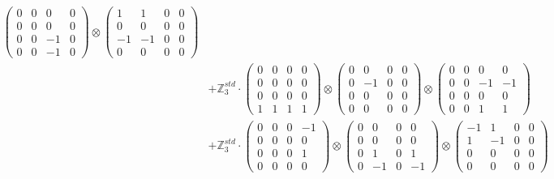 \documentclass{article}
\begin{document}
{\begin{align}
            \begin{pmatrix} 0 & 0 & 0 & 0 \\ 0 & 0 & 0 & 0 \\ 0 & 0 & -1 & 0 \\ 0 & 0 & -1 & 0 \end{pmatrix} \otimes 
            \begin{pmatrix} 1 & 1 & 0 & 0 \\ 0 & 0 & 0 & 0 \\ -1 & -1 & 0 & 0 \\ 0 & 0 & 0 & 0 \end{pmatrix} \\ 
        &+ \label{Rs1-Rc16-Solution-1-c10} \mathbb{Z}_3^{std} \cdot 
            \begin{pmatrix} 0 & 0 & 0 & 0 \\ 0 & 0 & 0 & 0 \\ 0 & 0 & 0 & 0 \\ 1 & 1 & 1 & 1 \end{pmatrix} \otimes 
            \begin{pmatrix} 0 & 0 & 0 & 0 \\ 0 & -1 & 0 & 0 \\ 0 & 0 & 0 & 0 \\ 0 & 0 & 0 & 0 \end{pmatrix} \otimes 
            \begin{pmatrix} 0 & 0 & 0 & 0 \\ 0 & 0 & -1 & -1 \\ 0 & 0 & 0 & 0 \\ 0 & 0 & 1 & 1 \end{pmatrix} \\ 
        &+ \label{Rs1-Rc16-Solution-1-c11} \mathbb{Z}_3^{std} \cdot 
            \begin{pmatrix} 0 & 0 & 0 & -1 \\ 0 & 0 & 0 & 0 \\ 0 & 0 & 0 & 1 \\ 0 & 0 & 0 & 0 \end{pmatrix} \otimes 
            \begin{pmatrix} 0 & 0 & 0 & 0 \\ 0 & 0 & 0 & 0 \\ 0 & 1 & 0 & 1 \\ 0 & -1 & 0 & -1 \end{pmatrix} \otimes 
            \begin{pmatrix} -1 & 1 & 0 & 0 \\ 1 & -1 & 0 & 0 \\ 0 & 0 & 0 & 0 \\ 0 & 0 & 0 & 0 \end{pmatrix} \\ 

\end{align}}
\end{document}

